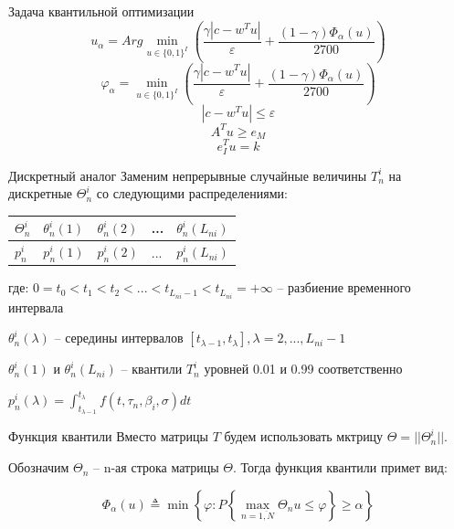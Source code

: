 \documentclass[aspectratio=169]{beamer}
\begin{document}
    \begin{frame}{Задача квантильной оптимизации}
        $$u_\alpha = Arg\min_{u\in\{0, 1\}^I}\left(\frac{\gamma\left|c-w^T u\right|}{\varepsilon} + \frac{(1-\gamma)\Phi_\alpha(u)}{2700}\right)$$
        $$\varphi_\alpha = \min_{u\in\{0, 1\}^I}\left(\frac{\gamma\left|c-w^T u\right|}{\varepsilon} + \frac{(1-\gamma)\Phi_\alpha(u)}{2700}\right)$$
        $$|c-w^T u|\leq\varepsilon$$
        $$A^T u\geq e_M$$
        $$e_I^T u=k$$
    \end{frame}
    
    \begin{frame}{Дискретный аналог}
        Заменим непрерывные случайные величины $T_n^i$ на дискретные $\Theta_n^i$ со следующими распределениями:\\
        
        \begin{table}[]
            \begin{tabular}{|l||l|l|l|l|}
                \hline
                $\Theta_n^i$ & $\theta_n^i(1)$ & $\theta_n^i(2)$ & ... & $\theta_n^i(L_{ni})$\\ \hline
                $p_n^i$ & $p_n^i(1)$ & $p_n^i(2)$ & ... & $p_n^i(L_{ni})$\\ \hline
            \end{tabular}
        \end{table}
        
        где:\newline
        $0 = t_0 < t_1 < t_2 < ... < t_{L_{ni}-1} < t_{L_{ni}} = +\infty$ -- разбиение временного интервала\newline
        
        $\theta_n^i(\lambda)$ -- середины интервалов $[t_{\lambda-1}, t_\lambda], \lambda=2,...,L_{ni}-1$\newline
        
        $\theta_n^i(1)$ и $\theta_n^i(L_{ni})$ -- квантили $T_n^i$ уровней 0.01 и 0.99 соответственно\newline
        
        $p_n^i(\lambda)=\int_{t_{\lambda-1}}^{t_\lambda}f(t, \tau_n, \beta_i, \sigma)dt$
    \end{frame}
    
    \begin{frame}{Функция квантили}
        Вместо матрицы $T$ будем использовать мктрицу $\Theta=||\Theta_n^i||$.
        
        Обозначим $\Theta_n$ -- n-ая строка матрицы $\Theta$. Тогда функция квантили примет вид:
        
        $$\Phi_\alpha(u)\triangleq\min\left\{\varphi:P\left\{\max_{n=\overline{1,N}}\Theta_n u\leq\varphi\right\}\geq\alpha\right\}$$
    \end{frame}
    
\end{document}

